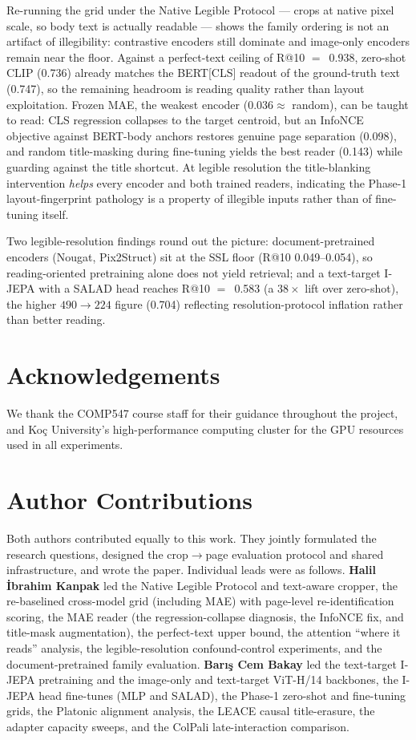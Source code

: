 \documentclass{article}
\begin{document}
Re-running the grid under the Native Legible Protocol --- crops at
native pixel scale, so body text is actually readable --- shows
the family ordering is not an artifact of illegibility: contrastive
encoders still dominate and image-only encoders remain near the
floor. Against a perfect-text ceiling of R@10 $=$~0.938, zero-shot
CLIP (0.736) already matches the BERT[CLS] readout of the
ground-truth text (0.747), so the remaining headroom is reading
quality rather than layout exploitation. Frozen MAE, the weakest
encoder ($0.036 \approx$ random), can be taught to read: CLS
regression collapses to the target centroid, but an InfoNCE
objective against BERT-body anchors restores genuine page
separation (0.098), and random title-masking during fine-tuning
yields the best reader (0.143) while guarding against the title
shortcut. At legible resolution the title-blanking intervention
\emph{helps} every encoder and both trained readers, indicating
the Phase-1 layout-fingerprint pathology is a property of
illegible inputs rather than of fine-tuning itself.

Two legible-resolution findings round out the picture:
document-pretrained encoders (Nougat, Pix2Struct) sit at the SSL
floor (R@10 0.049--0.054), so reading-oriented pretraining alone
does not yield retrieval; and a text-target I-JEPA with a SALAD head
reaches R@10 $=$~0.583 (a $38\times$ lift over zero-shot), the higher
$490{\to}224$ figure (0.704) reflecting resolution-protocol inflation
rather than better reading.

\section*{Acknowledgements}
We thank the COMP547 course staff for their guidance throughout the
project, and Ko\c{c} University's high-performance computing cluster
for the GPU resources used in all experiments.

\section*{Author Contributions}
Both authors contributed equally to this work. They jointly
formulated the research questions, designed the
crop$\rightarrow$page evaluation protocol and shared infrastructure,
and wrote the paper. Individual leads were as follows.
\textbf{Halil \.{I}brahim Kanpak} led the Native Legible Protocol
and text-aware cropper, the re-baselined cross-model grid
(including MAE) with page-level re-identification scoring, the MAE
reader (the regression-collapse diagnosis, the InfoNCE fix, and
title-mask augmentation), the perfect-text upper bound, the
attention ``where it reads'' analysis, the legible-resolution
confound-control experiments, and the document-pretrained family
evaluation. \textbf{Bar\i{}\c{s} Cem Bakay} led the text-target
I-JEPA pretraining and the image-only and text-target ViT-H/14
backbones, the I-JEPA head fine-tunes (MLP and SALAD), the Phase-1
zero-shot and fine-tuning grids, the Platonic alignment analysis,
the LEACE causal title-erasure, the adapter capacity sweeps, and the
ColPali late-interaction comparison.
\end{document}
